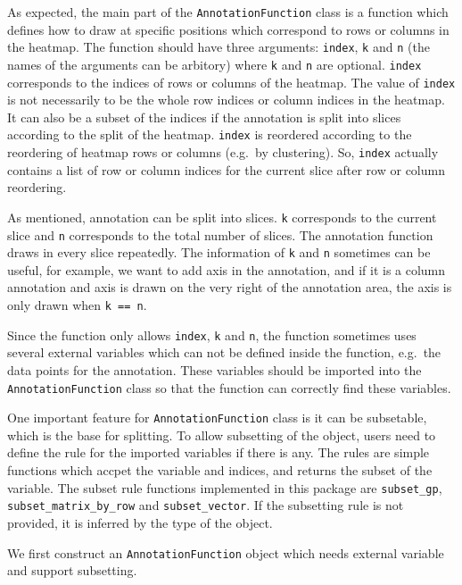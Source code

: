 \documentclass[]{book}
\theoremstyle{definition}
\theoremstyle{definition}
\theoremstyle{definition}
\theoremstyle{remark}
\begin{document}
As expected, the main part of the \texttt{AnnotationFunction} class is a
function which defines how to draw at specific positions which
correspond to rows or columns in the heatmap. The function should have
three arguments: \texttt{index}, \texttt{k} and \texttt{n} (the names of
the arguments can be arbitory) where \texttt{k} and \texttt{n} are
optional. \texttt{index} corresponds to the indices of rows or columns
of the heatmap. The value of \texttt{index} is not necessarily to be the
whole row indices or column indices in the heatmap. It can also be a
subset of the indices if the annotation is split into slices according
to the split of the heatmap. \texttt{index} is reordered according to
the reordering of heatmap rows or columns (e.g.~by clustering). So,
\texttt{index} actually contains a list of row or column indices for the
current slice after row or column reordering.

As mentioned, annotation can be split into slices. \texttt{k}
corresponds to the current slice and \texttt{n} corresponds to the total
number of slices. The annotation function draws in every slice
repeatedly. The information of \texttt{k} and \texttt{n} sometimes can
be useful, for example, we want to add axis in the annotation, and if it
is a column annotation and axis is drawn on the very right of the
annotation area, the axis is only drawn when \texttt{k\ ==\ n}.

Since the function only allows \texttt{index}, \texttt{k} and
\texttt{n}, the function sometimes uses several external variables which
can not be defined inside the function, e.g.~the data points for the
annotation. These variables should be imported into the
\texttt{AnnotationFunction} class so that the function can correctly
find these variables.

One important feature for \texttt{AnnotationFunction} class is it can be
subsetable, which is the base for splitting. To allow subsetting of the
object, users need to define the rule for the imported variables if
there is any. The rules are simple functions which accpet the variable
and indices, and returns the subset of the variable. The subset rule
functions implemented in this package are \texttt{subset\_gp},
\texttt{subset\_matrix\_by\_row} and \texttt{subset\_vector}. If the
subsetting rule is not provided, it is inferred by the type of the
object.

We first construct an \texttt{AnnotationFunction} object which needs
external variable and support subsetting.
\end{document}
